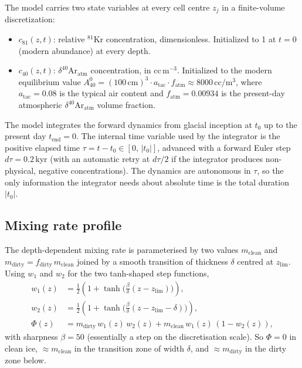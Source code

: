 \documentclass[11pt,a4paper]{article}
\newcommand{\Kr}{\ensuremath{{}^{81}\mathrm{Kr}}}
\newcommand{\Ar}{\ensuremath{\delta^{40}\mathrm{Ar}_{\mathrm{atm}}}}
\newcommand{\tzero}{\ensuremath{t_{0}}}
\newcommand{\tend}{\ensuremath{t_{\mathrm{end}}}}
\begin{document}
The model carries two state variables at every cell centre $z_j$ in a finite-volume
discretization:

\begin{itemize}
  \item $c_{81}(z, t)$: relative \Kr{} concentration, dimensionless. Initialized
        to 1 at $t=0$ (modern abundance) at every depth.
  \item $c_{40}(z, t)$: \Ar{} concentration, in $\mathrm{cc}\,\mathrm{m}^{-3}$.
        Initialized to the modern equilibrium value
        $A_{40}^{0} = (100\,\mathrm{cm})^{3}\cdot a_{\mathrm{tac}}\cdot
         f_{\mathrm{atm}} \approx 8000\,\mathrm{cc/m^{3}}$,
        where $a_{\mathrm{tac}}=0.08$ is the typical air content and
        $f_{\mathrm{atm}}=0.00934$ is the present-day atmospheric \Ar{} volume
        fraction.
\end{itemize}

The model integrates the forward dynamics from glacial inception at \tzero{}
up to the present day $\tend = 0$. The internal time variable used by the
integrator is the positive elapsed time $\tau = t - \tzero \in [0,\,
|\tzero|]$, advanced with a forward Euler step $d\tau=0.2\,\mathrm{kyr}$ (with
an automatic retry at $d\tau/2$ if the integrator produces non-physical,
negative concentrations). The dynamics are autonomous in $\tau$, so the only
information the integrator needs about absolute time is the total duration
$|\tzero|$.

\subsection{Mixing rate profile}

The depth-dependent mixing rate is parameterised by two values
$m_{\mathrm{clean}}$ and $m_{\mathrm{dirty}} = f_{\mathrm{dirty}}\,m_{\mathrm{clean}}$
joined by a smooth transition of thickness $\delta$ centred at
$z_{\mathrm{lim}}$. Using $w_1$ and $w_2$ for the two tanh-shaped step functions,
\begin{align}
w_1(z) &= \tfrac{1}{2}\!\left(1 + \tanh\!\big(\tfrac{\beta}{\delta}(z - z_{\mathrm{lim}})\big)\right), \\
w_2(z) &= \tfrac{1}{2}\!\left(1 + \tanh\!\big(\tfrac{\beta}{\delta}(z - z_{\mathrm{lim}} - \delta)\big)\right), \\
\Phi(z) &= m_{\mathrm{dirty}}\,w_1(z)\,w_2(z) + m_{\mathrm{clean}}\,w_1(z)\,(1 - w_2(z)),
\end{align}
with sharpness $\beta=50$ (essentially a step on the discretisation scale).
So $\Phi=0$ in clean ice, $\approx m_{\mathrm{clean}}$ in the transition zone of
width $\delta$, and $\approx m_{\mathrm{dirty}}$ in the dirty zone below.
\end{document}
